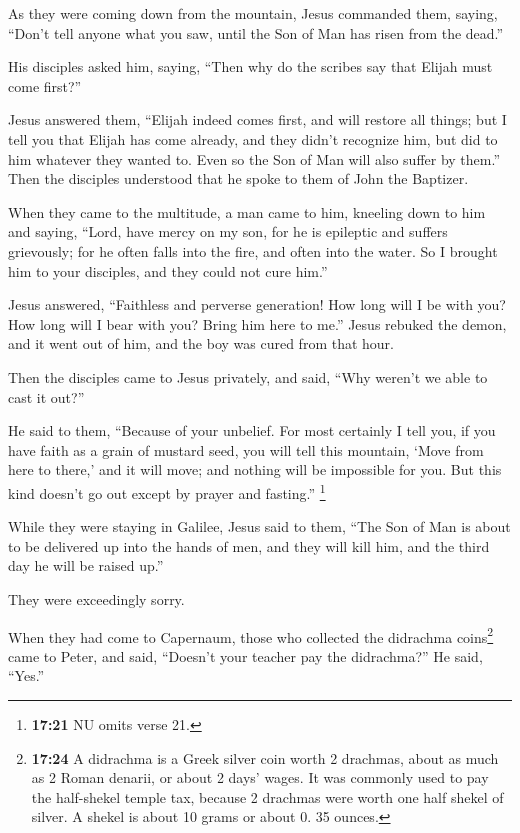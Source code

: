  As they were coming down from the mountain, Jesus
commanded them, saying, ``Don't tell anyone what you saw, until the Son
of Man has risen from the dead.''

 His disciples asked him, saying, ``Then why do the
scribes say that Elijah must come first?''

 Jesus answered them, ``Elijah indeed comes first, and
will restore all things;  but I tell you that Elijah has
come already, and they didn't recognize him, but did to him whatever
they wanted to. Even so the Son of Man will also suffer by them.''
 Then the disciples understood that he spoke to them of
John the Baptizer.

 When they came to the multitude, a man came to him,
kneeling down to him and saying,  ``Lord, have mercy on
my son, for he is epileptic and suffers grievously; for he often falls
into the fire, and often into the water.  So I brought
him to your disciples, and they could not cure him.''

 Jesus answered, ``Faithless and perverse generation! How
long will I be with you? How long will I bear with you? Bring him here
to me.''  Jesus rebuked the demon, and it went out of
him, and the boy was cured from that hour.

 Then the disciples came to Jesus privately, and said,
``Why weren't we able to cast it out?''

 He said to them, ``Because of your unbelief. For most
certainly I tell you, if you have faith as a grain of mustard seed, you
will tell this mountain, `Move from here to there,' and it will move;
and nothing will be impossible for you.  But this kind
doesn't go out except by prayer and fasting.'' \footnote{\textbf{17:21}
  NU omits verse 21.}

 While they were staying in Galilee, Jesus said to them,
``The Son of Man is about to be delivered up into the hands of men,
 and they will kill him, and the third day he will be
raised up.''

They were exceedingly sorry.

 When they had come to Capernaum, those who collected the
didrachma coins\footnote{\textbf{17:24} A didrachma is a Greek silver
  coin worth 2 drachmas, about as much as 2 Roman denarii, or about 2
  days' wages. It was commonly used to pay the half-shekel temple tax,
  because 2 drachmas were worth one half shekel of silver. A shekel is
  about 10 grams or about 0. 35 ounces.} came to Peter, and said,
``Doesn't your teacher pay the didrachma?''  He said,
``Yes.''

